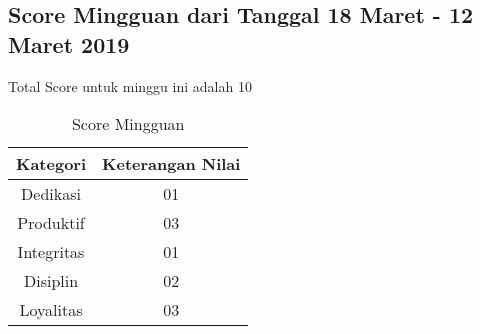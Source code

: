\subsection{Score Mingguan dari Tanggal 18 Maret - 12 Maret 2019}
Total Score untuk minggu ini adalah 10

\begin{table}[h]
\caption{Score Mingguan}
\centering
\begin{tabular}{|c|c|}
\hline
\textbf{Kategori}&\textbf{Keterangan Nilai}\\
\hline
Dedikasi&01\\
\hline
Produktif&03\\
\hline
Integritas&01\\
\hline
Disiplin&02\\
\hline
Loyalitas&03\\
\hline
\end{tabular}
\label{table:score mingguan}
\end{table}
